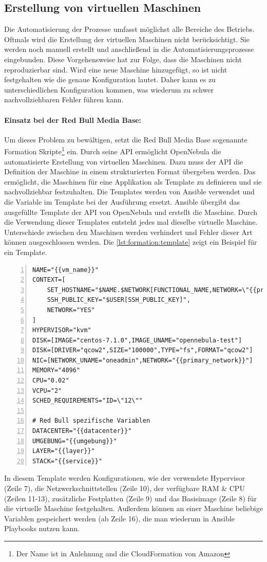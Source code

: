 \subsection{Erstellung von virtuellen Maschinen}
\label{sec:formation}
Die Automatisierung der Prozesse umfasst möglichst alle Bereiche des Betriebs. Oftmals wird die Erstellung der virtuellen Maschinen nicht berücksichtigt. Sie werden noch manuell erstellt und anschließend in die Automatisierungsprozesse eingebunden. Diese Vorgehensweise hat zur Folge, dass die Maschinen nicht reproduzierbar sind. Wird eine neue Maschine hinzugefügt, so ist nicht festgehalten wie die genaue Konfiguration lautet. Daher kann es zu unterschiedlichen Konfiguration kommen, was wiederum zu schwer nachvollziehbaren Fehler führen kann.

\paragraph{Einsatz bei der Red Bull Media Base:} 
Um dieses Problem zu bewältigen, setzt die Red Bull Media Base sogenannte Formation Skripte\footnote{Der Name ist in Anlehnung and die CloudFormation von Amazon} ein. Durch seine API ermöglicht OpenNebula die automatisierte Erstellung von virtuellen Maschinen. Dazu muss der API die Definition der Maschine in einem strukturierten Format übergeben werden. Das ermöglicht, die Maschinen für eine Applikation als Template zu definieren und sie nachvollziehbar festzuhalten. Die Templates werden von Ansible verwendet und die Variable im Template bei der Ausführung ersetzt. Ansible übergibt das ausgefüllte Template der API von OpenNebula und erstellt die Maschine. Durch die Verwendung dieser Templates entsteht jedes mal dieselbe virtuelle Maschine. Unterschiede zwischen den Maschinen werden verhindert und Fehler dieser Art können ausgeschlossen werden. Die \autoref{lst:formation:template} zeigt ein Beispiel für ein Template. 

\begin{lstlisting}[style=code,numbers=left,caption={Beispiel eines Formation Template für virtuelle Maschinen},label={lst:formation:template}]
NAME="{{vm_name}}"
CONTEXT=[
    SET_HOSTNAME="$NAME.$NETWORK[FUNCTIONAL_NAME,NETWORK=\"{{primary_network}}\"].{{datacenter}}.rbmbtnx.net",
    SSH_PUBLIC_KEY="$USER[SSH_PUBLIC_KEY]",
    NETWORK="YES"
]
HYPERVISOR="kvm"
DISK=[IMAGE="centos-7.1.0",IMAGE_UNAME="opennebula-test"]
DISK=[DRIVER="qcow2",SIZE="100000",TYPE="fs",FORMAT="qcow2"]
NIC=[NETWORK_UNAME="oneadmin",NETWORK="{{primary_network}}"]
MEMORY="4096"
CPU="0.02"
VCPU="2"
SCHED_REQUIREMENTS="ID=\"12\""

# Red Bull spezifische Variablen
DATACENTER="{{datacenter}}"
UMGEBUNG="{{umgebung}}"
LAYER="{{layer}}"
STACK="{{service}}"
\end{lstlisting}
In diesem Template werden Konfigurationen, wie der verwendete Hypervisor (Zeile 7), die Netzwerkschnittstellen (Zeile 10), der verfügbare RAM \& CPU (Zeilen 11-13), zusätzliche Festplatten (Zeile 9) und das Basisimage (Zeile 8) für die virtuelle Maschine festgehalten. Außerdem können an einer Maschine beliebige Variablen gespeichert werden (ab Zeile 16), die man wiederum in Ansible Playbooks nutzen kann. 

